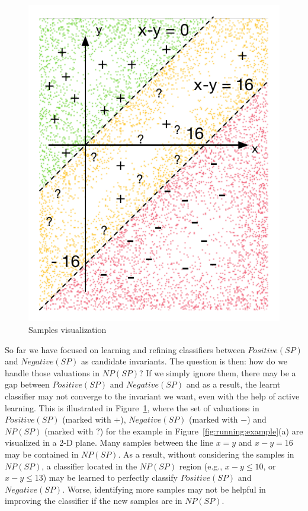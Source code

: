  \begin{figure}
	 \vspace{-8mm}
\centering
\includegraphics[scale=0.42]{figures/running-sampling.pdf}
 \caption{Samples visualization}
  \vspace{-6mm}
      \label{fig:running:example:sampling}
 \end{figure}

So far we have focused on learning and refining classifiers between $Positive(SP)$ and $Negative(SP)$ as candidate invariants. The question is then: how do we handle those valuations in $NP(SP)$? If we simply ignore them, there may be a gap between $Positive(SP)$ and $Negative(SP)$ and as a result, the learnt classifier may not converge to the invariant we want, even with the help of active learning.
This is illustrated in Figure~\ref{fig:running:example:sampling}, where the set of valuations in $Positive(SP)$ (marked with $+$), $Negative(SP)$ (marked with $-$) and $NP(SP)$ (marked with $?$) for the example in Figure~\ref{fig:running:example}(a) are visualized in a 2-D plane. Many samples between the line $x=y$ and $x-y=16$ may be contained in $NP(SP)$. As a result, without considering the samples in $NP(SP)$, a classifier located in the $NP(SP)$ region (e.g., $x - y \leq 10$, or $x - y \leq 13$) may be learned to perfectly classify $Positive(SP)$ and $Negative(SP)$. Worse, identifying more samples may not be helpful in improving the classifier if the new samples are in $NP(SP)$.

